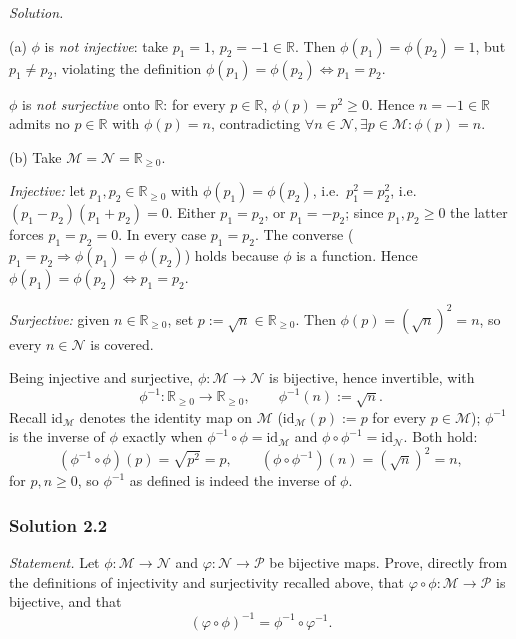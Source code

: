\documentclass[11pt]{article}
\begin{document}
\medskip
\noindent\textit{Solution.}

(a) $\phi$ is \emph{not injective}: take $p_1 = 1$, $p_2 = -1 \in \mathbb{R}$. Then $\phi(p_1) = \phi(p_2) = 1$, but $p_1 \neq p_2$, violating the definition $\phi(p_1) = \phi(p_2) \iff p_1 = p_2$.

$\phi$ is \emph{not surjective} onto $\mathbb{R}$: for every $p \in \mathbb{R}$, $\phi(p) = p^2 \geq 0$. Hence $n = -1 \in \mathbb{R}$ admits no $p \in \mathbb{R}$ with $\phi(p) = n$, contradicting $\forall n \in \mathcal{N}, \exists p \in \mathcal{M} : \phi(p) = n$.

(b) Take $\mathcal{M} = \mathcal{N} = \mathbb{R}_{\geq 0}$.

\emph{Injective:} let $p_1, p_2 \in \mathbb{R}_{\geq 0}$ with $\phi(p_1) = \phi(p_2)$, i.e.\ $p_1^2 = p_2^2$, i.e.\ $(p_1-p_2)(p_1+p_2) = 0$. Either $p_1 = p_2$, or $p_1 = -p_2$; since $p_1, p_2 \geq 0$ the latter forces $p_1 = p_2 = 0$. In every case $p_1 = p_2$. The converse ($p_1 = p_2 \Rightarrow \phi(p_1) = \phi(p_2)$) holds because $\phi$ is a function. Hence $\phi(p_1)=\phi(p_2) \iff p_1=p_2$.

\emph{Surjective:} given $n \in \mathbb{R}_{\geq 0}$, set $p := \sqrt{n} \in \mathbb{R}_{\geq 0}$. Then $\phi(p) = (\sqrt{n})^2 = n$, so every $n \in \mathcal{N}$ is covered.

Being injective and surjective, $\phi : \mathcal{M} \to \mathcal{N}$ is bijective, hence invertible, with
\[
\phi^{-1} : \mathbb{R}_{\geq 0} \longrightarrow \mathbb{R}_{\geq 0}, \qquad \phi^{-1}(n) := \sqrt{n}.
\]
Recall $\mathrm{id}_{\mathcal M}$ denotes the identity map on $\mathcal M$ ($\mathrm{id}_{\mathcal M}(p):=p$ for every $p\in\mathcal M$); $\phi^{-1}$ is the inverse of $\phi$ exactly when $\phi^{-1}\circ\phi=\mathrm{id}_{\mathcal M}$ and $\phi\circ\phi^{-1}=\mathrm{id}_{\mathcal N}$. Both hold:
\[
(\phi^{-1}\circ\phi)(p) = \sqrt{p^2} = p, \qquad (\phi\circ\phi^{-1})(n) = (\sqrt{n})^2 = n,
\]
for $p,n\geq 0$, so $\phi^{-1}$ as defined is indeed the inverse of $\phi$.

\subsubsection*{Solution 2.2}

\noindent\textit{Statement.} Let $\phi : \mathcal{M} \to \mathcal{N}$ and $\varphi : \mathcal{N} \to \mathcal{P}$ be bijective maps. Prove, directly from the definitions of injectivity and surjectivity recalled above, that $\varphi \circ \phi : \mathcal{M} \to \mathcal{P}$ is bijective, and that
\[
(\varphi \circ \phi)^{-1} = \phi^{-1} \circ \varphi^{-1}.
\]
\end{document}

